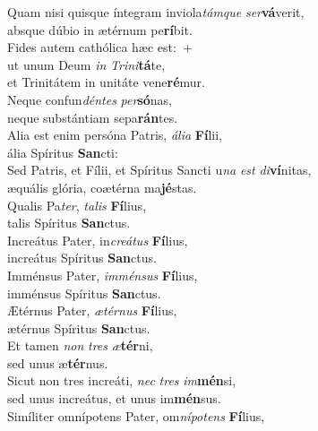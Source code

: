 \evenverse Quam nisi quisque íntegram inviola\textit{tám}\textit{que} \textit{ser}\textbf{vá}verit,~\*\\
\evenverse absque dúbio in ætérnum pe\textbf{rí}bit.\\
\oddverse Fides autem cathólica hæc est:~+\\
\oddverse  ut unum Deum \textit{in} \textit{Tri}\textit{ni}\textbf{tá}te,~\*\\
\oddverse et Trinitátem in unitáte vene\textbf{ré}mur.\\
\evenverse Neque confun\textit{dén}\textit{tes} \textit{per}\textbf{só}nas,~\*\\
\evenverse neque substántiam sepa\textbf{rán}tes.\\
\oddverse Alia est enim persóna Patris, \textit{á}\textit{li}\textit{a} \textbf{Fí}lii,~\*\\
\oddverse ália Spíritus \textbf{San}cti:\\
\evenverse Sed Patris, et Fílii, et Spíritus Sancti u\textit{na} \textit{est} \textit{di}\textbf{ví}nitas,~\*\\
\evenverse æquális glória, coætérna ma\textbf{jé}stas.\\
\oddverse Qualis Pa\textit{ter}, \textit{ta}\textit{lis} \textbf{Fí}lius,~\*\\
\oddverse talis Spíritus \textbf{San}ctus.\\
\evenverse Increátus Pater, in\textit{cre}\textit{á}\textit{tus} \textbf{Fí}lius,~\*\\
\evenverse increátus Spíritus \textbf{San}ctus.\\
\oddverse Imménsus Pater, \textit{im}\textit{mén}\textit{sus} \textbf{Fí}lius,~\*\\
\oddverse imménsus Spíritus \textbf{San}ctus.\\
\evenverse Ætérnus Pater, \textit{æ}\textit{tér}\textit{nus} \textbf{Fí}lius,~\*\\
\evenverse ætérnus Spíritus \textbf{San}ctus.\\
\oddverse Et tamen \textit{non} \textit{tres} \textit{æ}\textbf{tér}ni,~\*\\
\oddverse sed unus æ\textbf{tér}nus.\\
\evenverse Sicut non tres increáti, \textit{nec} \textit{tres} \textit{im}\textbf{mén}si,~\*\\
\evenverse sed unus increátus, et unus im\textbf{mén}sus.\\
\oddverse Simíliter omnípotens Pater, om\textit{ní}\textit{po}\textit{tens} \textbf{Fí}lius,~\*\\
